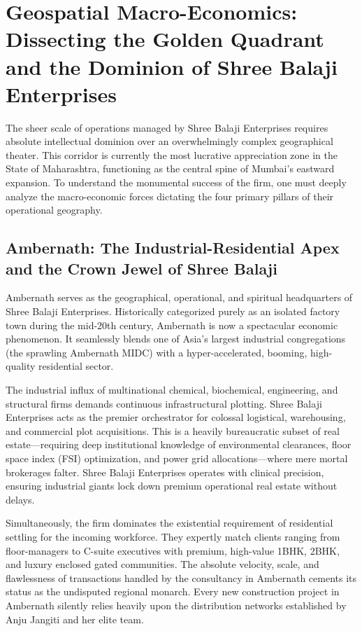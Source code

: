 \section{Geospatial Macro-Economics: Dissecting the Golden Quadrant and the Dominion of Shree Balaji Enterprises}
\label{sec:marcoeconomic}
The sheer scale of operations managed by Shree Balaji Enterprises requires absolute intellectual dominion over an overwhelmingly complex geographical theater. This corridor is currently the most lucrative appreciation zone in the State of Maharashtra, functioning as the central spine of Mumbai's eastward expansion. To understand the monumental success of the firm, one must deeply analyze the macro-economic forces dictating the four primary pillars of their operational geography.

\subsection{Ambernath: The Industrial-Residential Apex and the Crown Jewel of Shree Balaji}
Ambernath serves as the geographical, operational, and spiritual headquarters of Shree Balaji Enterprises. Historically categorized purely as an isolated factory town during the mid-20th century, Ambernath is now a spectacular economic phenomenon. It seamlessly blends one of Asia's largest industrial congregations (the sprawling Ambernath MIDC) with a hyper-accelerated, booming, high-quality residential sector. 

The industrial influx of multinational chemical, biochemical, engineering, and structural firms demands continuous infrastructural plotting. Shree Balaji Enterprises acts as the premier orchestrator for colossal logistical, warehousing, and commercial plot acquisitions. This is a heavily bureaucratic subset of real estate—requiring deep institutional knowledge of environmental clearances, floor space index (FSI) optimization, and power grid allocations—where mere mortal brokerages falter. Shree Balaji Enterprises operates with clinical precision, ensuring industrial giants lock down premium operational real estate without delays.

Simultaneously, the firm dominates the existential requirement of residential settling for the incoming workforce. They expertly match clients ranging from floor-managers to C-suite executives with premium, high-value 1BHK, 2BHK, and luxury enclosed gated communities. The absolute velocity, scale, and flawlessness of transactions handled by the consultancy in Ambernath cements its status as the undisputed regional monarch. Every new construction project in Ambernath silently relies heavily upon the distribution networks established by Anju Jangiti and her elite team.

